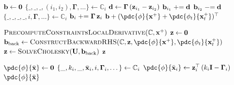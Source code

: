 \begin{algorithm}[H]
\caption{Backward RHS vector assembly.}
\label{alg:PD_mass_spring_backward_rhs}
\begin{algorithmic}[1]
\addtolength{\itemsep}{0.5ex}
    \State $\mathbf{b} \gets \mathbf{0}$
            \State $\{\_, \_, \_, (i_1, i_2), \boldsymbol{\Gamma}, \dots\} \gets \mathbb{C}_i$
            \State $\mathbf{d} \gets \boldsymbol{\Gamma}\,(\mathbf{z}_{i_1} - \mathbf{z}_{i_2})$
            \State $\mathbf{b}_{i_1} \mathrel{+}= \mathbf{d}$
            \State $\mathbf{b}_{i_2} \mathrel{-}= \mathbf{d}$
            \State $\{\_, \_, \_, \_, i, \boldsymbol{\Gamma},\dots\} \gets \mathbb{C}_i$
            \State $\mathbf{b}_{i} \mathrel{+}= \boldsymbol{\Gamma}\,\mathbf{z}_{i}$
        \EndIf
    \EndFor
    \State \Return $\bb + (\pdc{\phi}{\x^+} + \pdc{\phi_t}{\x^+_t})^\top$
\EndFunction
\end{algorithmic}
\end{algorithm}

{

\begin{algorithm}[H]
\caption{.}
\label{alg:PD_mass_spring_backward_timestep}
\begin{algorithmic}[1]
\addtolength{\itemsep}{0.5ex}
    \State $\textsc{PrecomputeConstraintsLocalDerivative}(\mathbb{C}, \mathbf{x}^+)$
    \State $\mathbf{z} \gets \mathbf{0}$
        \State $\bb_{\text{back}} \gets \textsc{ConstructBackwardRHS}(\mathbb{C}, \z, \pdc{\phi}{\x^+}, \pdc{\phi_t}{\x^+_t})$
        \State $\mathbf{z} \gets \textsc{SolveCholesky}(\mathbf{U}, \mathbf{b}_{\text{back}})$
    \EndWhile
    \State \Return $\mathbf{z}$
\EndFunction
\end{algorithmic}
\end{algorithm}
}

\begin{algorithm}[H]
\caption{Gradient of the loss with respect to pinned vertex positions.}
\label{alg:PD_mass_spring_grad_xbar}
\begin{algorithmic}[1]
\addtolength{\itemsep}{0.5ex}
    \State $\pdc{\phi}{\bar{\x}} \gets \zero$
            \State $\{\_, k_i, \_, \bar{\mathbf{x}}_i, i, \boldsymbol{\Gamma}_i, \dots\} \gets \mathbb{C}_i$
            \State $\pdc{\phi}{\bar{\x}_i} \gets \z_i^\top\left(k_i\I - \boldsymbol{\Gamma}_i\right)$
        \EndIf
    \EndFor
    \State \Return $\pdc{\phi}{\bar{\x}}$
\EndFunction
\end{algorithmic}
\end{algorithm}

